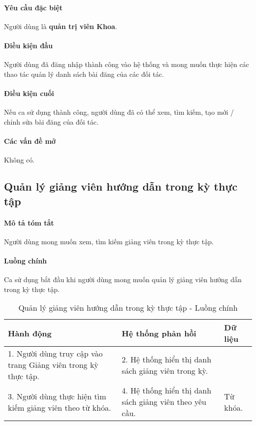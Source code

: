 \documentclass[./../main.tex]{subfiles}
\begin{document}
\paragraph*{Yêu cầu đặc biệt}

Người dùng là \textbf{quản trị viên Khoa}.

\paragraph*{Điều kiện đầu}

Người dùng đã đăng nhập thành công vào hệ thống và mong muốn thực hiện các thao tác quản lý danh sách bài đăng của các đối tác.

\paragraph*{Điều kiện cuối}

Nếu ca sử dụng thành công, người dùng đã có thể xem, tìm kiếm, tạo mới / chỉnh sửa bài đăng của đối tác.

\paragraph*{Các vấn đề mở}

Không có.

\subsection{Quản lý giảng viên hướng dẫn trong kỳ thực tập}

\paragraph*{Mô tả tóm tắt}

Người dùng mong muốn xem, tìm kiếm giảng viên trong kỳ thực tập.

\paragraph*{Luồng chính} Ca sử dụng bắt đầu khi người dùng mong muốn quản lý giảng viên hướng dẫn trong kỳ thực tập.

\begin{table}[H]
	\caption{Quản lý giảng viên hướng dẫn trong kỳ thực tập - Luồng chính}
	\label{tab:orgAdmin_manage_internship_lecturers}
	\begin{tabularx}{\textwidth}{|X|X|X|}
		\hline
		\textbf{Hành động}                                             & \textbf{Hệ thống phản hồi}                              & \textbf{Dữ liệu} \\ \hline
		1. Người dùng truy cập vào trang Giảng viên trong kỳ thực tập. & 2. Hệ thống hiển thị danh sách giảng viên trong kỳ.     &                  \\ \hline
		3. Người dùng thực hiện tìm kiếm giảng viên theo từ khóa.      & 4. Hệ thống hiển thị danh sách giảng viên theo yêu cầu. & Từ khóa.         \\ \hline
	\end{tabularx}
\end{table}
\end{document}
